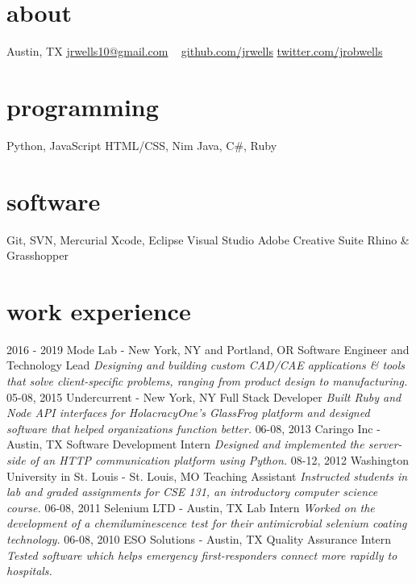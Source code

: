 \documentclass[]{cv}
\begin{document}

\begin{aside}
  \section{about}
    {Austin, TX}
    \href{mailto:jrwells10@gmail.com}{jrwells10@gmail.com}
    ~
    \href{http://github.com/jrwells}{github.com/jrwells}
    \href{https://twitter.com/jrobwells}{twitter.com/jrobwells}
  \section{programming}
    Python, JavaScript
    HTML/CSS, Nim
    Java, C\#, Ruby
  \section{software}
    Git, SVN, Mercurial
    Xcode, Eclipse
    Visual Studio
    Adobe Creative Suite
    Rhino \& Grasshopper
\end{aside}

\section{work experience}

\begin{entrylist}
  \entry
    {2016 - 2019}
    {Mode Lab - New York, NY and Portland, OR}
    {Software Engineer and Technology Lead}
    {\emph{Designing and building custom CAD/CAE applications \& tools that solve client-specific problems, ranging from product design to manufacturing.}}
  \entry
    {05-08, 2015}
    {Undercurrent - New York, NY}
    {Full Stack Developer}
    {\emph{Built Ruby and Node API interfaces for HolacracyOne's GlassFrog platform and designed software that helped organizations function better.}}
  \entry
    {06-08, 2013}
    {Caringo Inc - Austin, TX}
    {Software Development Intern}
    {\emph{Designed and implemented the server-side of an HTTP communication platform using Python.}}
  \entry
    {08-12, 2012}
    {Washington University in St. Louis - St. Louis, MO}
    {Teaching Assistant}
    {\emph{Instructed students in lab and graded assignments for CSE 131, an introductory computer science course.}}
  \entry
    {06-08, 2011}
    {Selenium LTD - Austin, TX}
    {Lab Intern}
    {\emph{Worked on the development of a chemiluminescence test for their antimicrobial selenium coating technology.}}
  \entry
    {06-08, 2010}
    {ESO Solutions - Austin, TX}
    {Quality Assurance Intern}
    {\emph{Tested software which helps emergency first-responders connect more rapidly to hospitals.}}
\end{entrylist}
\end{document}
